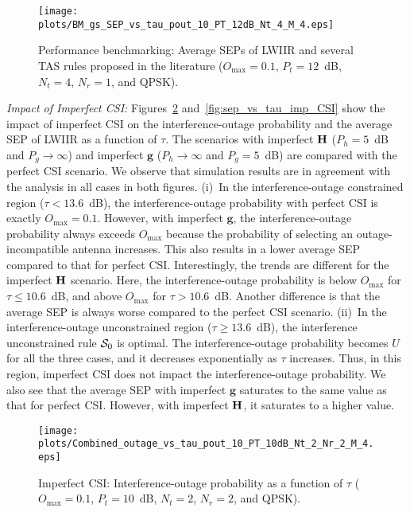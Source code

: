 \documentclass[12pt,draftcls,peerreview,onecolumn]{IEEEtran}
\newcommand{\tendsto}{\to}
\newcommand{\mtx}[1]{{\bf #1}} %
\newcommand{\Nt}{{N_t}}
\newcommand{\Nr}{{N_r}}
\newcommand{\Pt}{{P_t}}
\newcommand{\puch}{g}
\newcommand{\g}{\mathbf{\puch}}
\newcommand{\outmax}{O_{\text{max}}}
\newcommand{\itau}{\tau}
\newcommand{\un}{U}
\newcommand{\Hmx}{\mtx{H}}
\newcommand{\caluncons}{{\cal S_{\text{0}}}}
\newcommand{\gpilotpower}{P_g}
\newcommand{\hpilotpower}{P_h}
\begin{document}
\begin{figure}
	\centering \texttt{[image: plots/BM\_gs\_SEP\_vs\_tau\_pout\_10\_PT\_12dB\_Nt\_4\_M\_4.eps]}
	\caption{Performance benchmarking: Average SEPs of LWIIR and several TAS rules proposed in the literature ($\outmax = 0.1$, $\Pt = 12$~dB, $\Nt = 4$, $\Nr=1$, and QPSK).}
	\label{fig:BM_SEP_vs_tau}
\end{figure}


{\em Impact of Imperfect CSI:} Figures~\ref{fig:out_vs_tau_imp_CSI} and~\ref{fig:sep_vs_tau_imp_CSI} show the impact of imperfect CSI on the interference-outage probability and the average SEP of LWIIR as a function of $\tau$. The scenarios with imperfect $\Hmx$ ($\hpilotpower=5$~dB and $\gpilotpower\tendsto\infty$) and imperfect $\g$ ($\hpilotpower\tendsto\infty$ and $\gpilotpower=5$~dB) are compared with the perfect CSI scenario. We observe that simulation results are in agreement with the analysis in all cases in both figures. (i)~In the interference-outage constrained region ($\itau<13.6$~dB), the interference-outage probability with perfect CSI is exactly $\outmax=0.1$. However, with imperfect $\g$, the interference-outage probability always exceeds  $\outmax$ because the probability of selecting an outage-incompatible antenna increases. This also results in a  lower average SEP compared to that for perfect CSI. Interestingly, the trends are different for the imperfect $\Hmx$ scenario. Here, the interference-outage probability is below $\outmax$ for $\itau\leq10.6$~dB, and above $\outmax$ for $\itau>10.6$~dB. Another difference is that the average SEP is always worse compared to the perfect CSI scenario. (ii)~In the interference-outage unconstrained region ($\itau \geq 13.6$~dB),  
the interference unconstrained rule $\caluncons$ is optimal. The interference-outage probability becomes $\un$ for all the three cases, and it decreases exponentially as $\itau$ increases. Thus, in this region, imperfect CSI does not impact the interference-outage probability. We also see that the average SEP with imperfect $\g$ saturates to the same value as that for perfect CSI. However, with imperfect $\Hmx$, it saturates to a higher value. %

\begin{figure}
	\centering
	 \texttt{[image: plots/Combined\_outage\_vs\_tau\_pout\_10\_PT\_10dB\_Nt\_2\_Nr\_2\_M\_4.eps]}
	\caption{Imperfect CSI: Interference-outage probability as a function of $\itau$ ($\outmax=0.1$, $\Pt = 10$~dB, $\Nt = 2$, $\Nr = 2$, and QPSK).}
	\label{fig:out_vs_tau_imp_CSI}
\end{figure}
\end{document}
